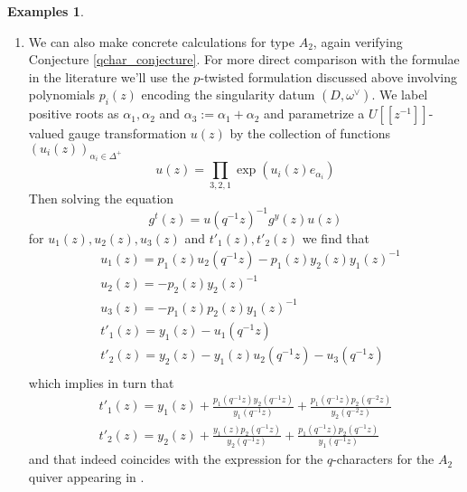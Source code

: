 \documentclass[11pt, oneside, reqno]{amsart}
\theoremstyle{definition} \newtheorem{definition}{Definition}[section]
\theoremstyle{definition} \newtheorem{remark}[definition]{Remark}
\theoremstyle{definition} \newtheorem{remarks}[definition]{Remarks}
\theoremstyle{definition} \newtheorem{question}[definition]{Question}
\theoremstyle{definition} \newtheorem*{note}{Note}
\theoremstyle{definition} \newtheorem{example}[definition]{Example}
\theoremstyle{definition} \newtheorem{examples}[definition]{Examples}
\begin{document}
\begin{examples}
\begin{enumerate}
 \item We can also make concrete calculations for type $A_2$, again verifying Conjecture \ref{qchar_conjecture}.  For more direct comparison with the formulae in the literature we'll use the $p$-twisted formulation discussed above involving polynomials $p_i(z)$ encoding the singularity datum $(D, \omega^\vee)$.  We label positive roots as $\alpha_1, \alpha_2$ and $\alpha_3:=\alpha_1 + \alpha_2$ and parametrize a $U[[z^{-1}]]$-valued
  gauge transformation $u(z)$ by the collection of functions  
 $(u_{i}(z))_{\alpha_i  \in \Delta^{+}}$ 
  \begin{equation*}
    u(z) = \prod_{3,2,1} \exp( u_{i}(z) e_{\alpha_i})
  \end{equation*}
Then solving the equation 
\begin{equation*}
g^t(z) =  u(q^{-1} z)^{-1} g^y(z) u(z)
\end{equation*}
for $u_{1}(z), u_{2}(z), u_{3}(z)$ and $t'_{1}(z), t'_{2}(z)$  we find that
\begin{equation*}
\begin{aligned}
& u_{1}(z) = p_{1}(z) u_{2}(q^{-1} z)-p_{1}(z) y_{2}(z) y_{1}(z)^{-1} \\
& u_{2}(z) =  -p_{2}(z) y_{2}(z)^{-1} \\
& u_{3}(z) = -p_{1}(z) p_{2}(z) y_{1}(z)^{-1} \\
& t'_{1}(z) = y_{1}(z)-u_{1}(q^{-1}z) \\
& t'_{2}(z) = y_{2}(z) - y_{1}(z) u_{2}(q^{-1}z)-u_{3}(q^{-1}z) \\
\end{aligned}
\end{equation*}
which implies in turn that
\begin{equation*}
  \begin{aligned}
    t'_{1}(z) =y_{1}(z)  +  \frac{p_{1}(q^{-1}z) y_{2}(q^{-1}z)}{y_{1}(q^{-1}z)} + \frac{p_{1}(q^{-1}z) p_{2}(q^{-2} z)}{ y_{2}(q^{-2} z)}\\
    t'_{2}(z) = y_{2}(z)  +\frac{y_{1}(z) p_{2}(q^{-1}z)}{y_{2}(q^{-1}z)}+   \frac{p_{1}(q^{-1}z) p_{2}(q^{-1}z)}{y_{1}(q^{-1}z)}
  \end{aligned}
\end{equation*}
and that indeed coincides with the expression for the $q$-characters for the $A_2$ quiver appearing in
\cite{Nekrasov:2015wsu,NekrasovPestunShatashvili,NekrasovPestun,Kimura:2015rgi}.


\end{enumerate}
\end{examples}
\end{document}
